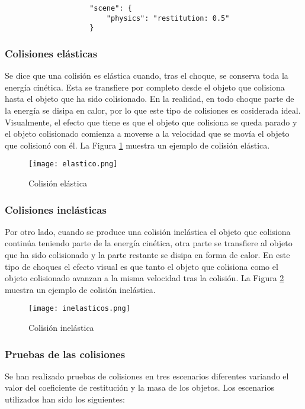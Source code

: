 \begin{verbatim}
                    "scene": {
                        "physics": "restitution: 0.5"
                    }
\end{verbatim}

\subsubsection{Colisiones elásticas}
Se dice que una colisión es elástica cuando, tras el choque, se conserva toda la energía cinética. Esta se transfiere por completo desde el objeto que colisiona hasta el objeto que ha sido colisionado. En la realidad, en todo choque parte de la energía se disipa en calor, por lo que este tipo de colisiones es cosiderada ideal. Visualmente, el efecto que tiene es que el objeto que colisiona se queda parado y el objeto colisionado comienza a moverse a la velocidad que se movía el objeto que colisionó con él. La Figura \ref{fig:elastico} muestra un ejemplo de colisión elástica.

\begin{figure}[h!]
    \centering
    \texttt{[image: elastico.png]}
    \caption{Colisión elástica\footnotemark}
    \label{fig:elastico}
\end{figure}


\subsubsection{Colisiones inelásticas}
Por otro lado, cuando se produce una colisión inelástica el objeto que colisiona continúa teniendo parte de la energía cinética, otra parte se transfiere al objeto que ha sido colisionado y la parte restante se disipa en forma de calor. En este tipo de choques el efecto visual es que tanto el objeto que colisiona como el objeto colisionado avanzan a la misma velocidad tras la colisión. La Figura \ref{fig:inelastico} muestra un ejemplo de colisión inelástica.

\begin{figure}[h!]
    \centering
    \texttt{[image: inelasticos.png]}
    \caption{Colisión inelástica\footnotemark}
    \label{fig:inelastico}
\end{figure}

\subsubsection{Pruebas de las colisiones}
Se han realizado pruebas de colisiones en tres escenarios diferentes variando el valor del coeficiente de restitución y la masa de los objetos. Los escenarios utilizados han sido los siguientes:

